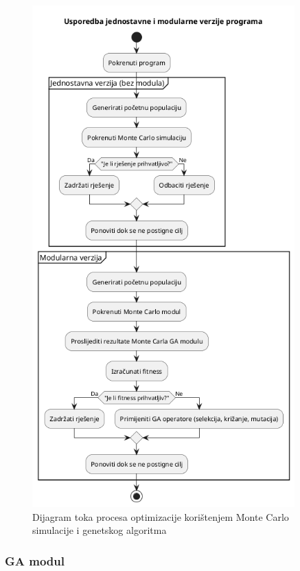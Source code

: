 \begin{figure}
    \centering
    \includegraphics[width=0.9\textwidth]{slike/diagram_mc_ga.png}
    \caption{Dijagram toka procesa optimizacije korištenjem Monte Carlo simulacije i genetskog algoritma}
    \label{fig:diagram_ga_mc}
\end{figure}


\subsubsection{GA modul}

